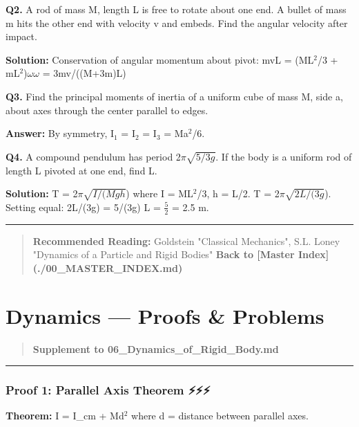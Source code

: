\documentclass[12pt,a4paper,openany]{book}
\begin{document}
{{\textbf{Q2.} A rod of mass M, length L is free to rotate about one end. A bullet of mass m hits the other end with velocity v and embeds. Find the angular velocity after impact.

\textbf{Solution:} Conservation of angular momentum about pivot:
mvL = (ML$^2$/3 + mL$^2$)$\omega\omega$ = 3mv/((M+3m)L)

\textbf{Q3.} Find the principal moments of inertia of a uniform cube of mass M, side a, about axes through the center parallel to edges.

\textbf{Answer:} By symmetry, I$_1$ = I$_2$ = I$_3$ = Ma$^2$/6.

\textbf{Q4.} A compound pendulum has period 2$\pi$$\sqrt{5/3g}$. If the body is a uniform rod of length L pivoted at one end, find L.

\textbf{Solution:} T = 2$\pi$$\sqrt{I/(Mgh}$) where I = ML$^2$/3, h = L/2.
T = 2$\pi$$\sqrt{2L/(3g}$). Setting equal: 2L/(3g) = 5/(3g)  L = $\frac{5}{2}$ = 2.5 m.

\bigskip\noindent\rule{\textwidth}{0.4pt}\bigskip

\begin{quote}
\textbf{ Recommended Reading:} Goldstein "Classical Mechanics", S.L. Loney "Dynamics of a Particle and Rigid Bodies"
\textbf{ Back to [Master Index](./00_MASTER_INDEX.md)}
\end{quote}

\newpage

\chapter{Dynamics --- Proofs \& Problems}


\begin{quote}
\textbf{Supplement to 06_Dynamics_of_Rigid_Body.md}
\end{quote}

\bigskip\noindent\rule{\textwidth}{0.4pt}\bigskip


\subsection{Proof 1: Parallel Axis Theorem ⚡⚡⚡}

\begin{tcolorbox}[colback=lightblue,colframe=thmblue,title=\textbf{Theorem},breakable,boxrule=1.5pt]
\textbf{Theorem:} I = I_cm + Md$^2$ where d = distance between parallel axes.
\end{tcolorbox}

}}
\end{document}
